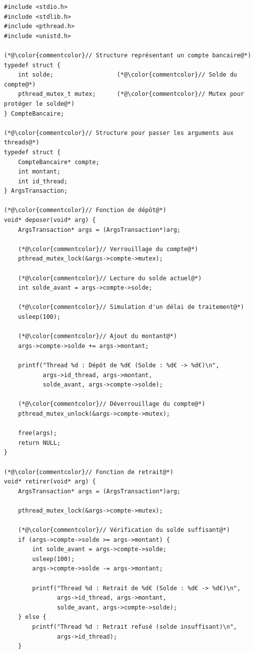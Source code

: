 \documentclass[11pt,a4paper]{article}
\begin{document}
\begin{lstlisting}[caption={Simulation de transactions bancaires}]
#include <stdio.h>
#include <stdlib.h>
#include <pthread.h>
#include <unistd.h>

(*@\color{commentcolor}// Structure représentant un compte bancaire@*)
typedef struct {
    int solde;                  (*@\color{commentcolor}// Solde du compte@*)
    pthread_mutex_t mutex;      (*@\color{commentcolor}// Mutex pour protéger le solde@*)
} CompteBancaire;

(*@\color{commentcolor}// Structure pour passer les arguments aux threads@*)
typedef struct {
    CompteBancaire* compte;
    int montant;
    int id_thread;
} ArgsTransaction;

(*@\color{commentcolor}// Fonction de dépôt@*)
void* deposer(void* arg) {
    ArgsTransaction* args = (ArgsTransaction*)arg;
    
    (*@\color{commentcolor}// Verrouillage du compte@*)
    pthread_mutex_lock(&args->compte->mutex);
    
    (*@\color{commentcolor}// Lecture du solde actuel@*)
    int solde_avant = args->compte->solde;
    
    (*@\color{commentcolor}// Simulation d'un délai de traitement@*)
    usleep(100);
    
    (*@\color{commentcolor}// Ajout du montant@*)
    args->compte->solde += args->montant;
    
    printf("Thread %d : Dépôt de %d€ (Solde : %d€ -> %d€)\n",
           args->id_thread, args->montant, 
           solde_avant, args->compte->solde);
    
    (*@\color{commentcolor}// Déverrouillage du compte@*)
    pthread_mutex_unlock(&args->compte->mutex);
    
    free(args);
    return NULL;
}

(*@\color{commentcolor}// Fonction de retrait@*)
void* retirer(void* arg) {
    ArgsTransaction* args = (ArgsTransaction*)arg;
    
    pthread_mutex_lock(&args->compte->mutex);
    
    (*@\color{commentcolor}// Vérification du solde suffisant@*)
    if (args->compte->solde >= args->montant) {
        int solde_avant = args->compte->solde;
        usleep(100);
        args->compte->solde -= args->montant;
        
        printf("Thread %d : Retrait de %d€ (Solde : %d€ -> %d€)\n",
               args->id_thread, args->montant,
               solde_avant, args->compte->solde);
    } else {
        printf("Thread %d : Retrait refusé (solde insuffisant)\n",
               args->id_thread);
    }
    

\end{lstlisting}
\end{document}
